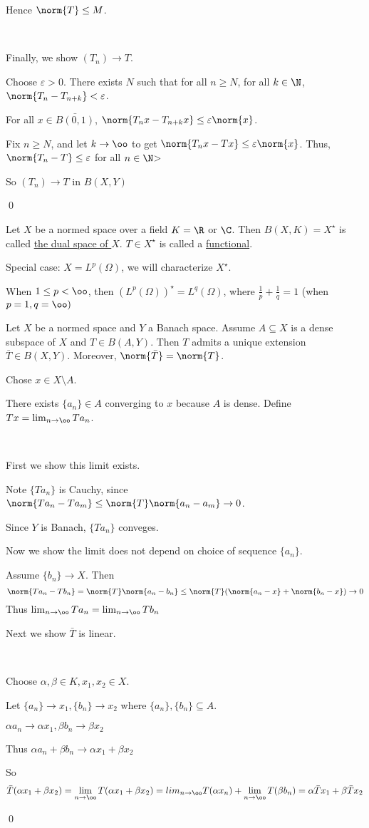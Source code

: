 \documentclass[x11names,reqno,14pt]{extarticle}
\begin{document}
Hence $\norm{T}\leq M$. 

\,

Finally, we show $(T_n)\to T$. 

Choose $\varepsilon>0$. There exists $N$ such that for all $n \geq N$, for all $k \in \N$, $\norm{T_n - T_{n + k}}<\varepsilon$. 

For all $x \in \bar{B(0, 1)}$, $\norm{T_nx - T_{n + k}x} \leq \varepsilon\norm{x}$. 

Fix $n \geq N$, and let $k\to\oo$ to get $\norm{T_nx - Tx} \leq \varepsilon\norm{x}$. Thus, $\norm{T_n - T} \leq \varepsilon$ for all $n \in \N$> 

So $(T_n) \to T$ in $B(X, Y)$

\qed


Let $X$ be a normed space over a field $K = \R$ or $\C$. Then $B(X, K) = X^\star$ is called \underline{the dual space of $X$}. $T \in X^\star$ is called a \underline{functional}.

Special case: $X = L^p(\Omega)$, we will characterize $X^\star$. 

When $1 \leq p < \oo$, then $(L^p(\Omega))^\star = L^q(\Omega)$, where $\frac{1}{p} + \frac{1}{q} = 1$ (when $p = 1, q = \oo)$

\thm

Let $X$ be a normed space and $Y$ a Banach space. Assume $A \subseteq X$ is a dense subspace of $X$ and $T\in B(A, Y)$. Then $T$ admits a unique extension $\bar{T}\in B(X, Y).$ Moreover, $\norm{\bar{T}} = \norm{T}$. 

\proof

Chose $x \in X\setminus A$. 

There exists $\{a_n\} \in A$ converging to $x$ because $A$ is dense. Define $Tx = \lim_{n\to\oo}Ta_n$. 

\,

First we show this limit exists. 

Note $\{Ta_n\}$ is Cauchy, since $\norm{Ta_n - Ta_m} \leq \norm{T}\norm{a_n - a_m} \to 0$. 

Since $Y$ is Banach, $\{Ta_n\}$ conveges. 

Now we show the limit does not depend on choice of sequence $\{a_n\}$. 

Assume $\{b_n\}\to X$. Then
\[
\norm{Ta_n - Tb_n} = \norm{T} \norm{a_n - b_n} \leq \norm{T}(\norm{a_n - x} + \norm{b_n - x}) \to 0
\]
Thus $\lim_{n\to\oo}Ta_n = \lim_{n\to\oo}Tb_n$

Next we show $\bar{T}$ is linear.

\,

Choose $\alpha,\beta \in K, x_1, x_2 \in X$. 

Let $\{a_n\}\to x_1, \{b_n\}\to x_2$ where $\{a_n\},\{b_n\}\subseteq A$. 

$\alpha a_n \to \alpha x_1, \beta b_n \to \beta x_2$

Thus $\alpha a_n + \beta b_n \to \alpha x_1 + \beta x_2$

So
\[
\bar{T}(\alpha x_1 + \beta x_2) = \lim_{n\to\oo}T(\alpha x_1 + \beta x_2) = lim_{n\to\oo}T(\alpha x_n) + \lim_{n\to\oo}T(\beta b_n) = \alpha \bar{T}x_1 + \beta \bar{T}x_2
\]

\qed
\end{document}
